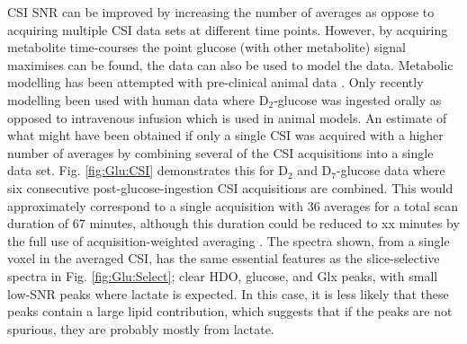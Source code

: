 \ac{CSI} \ac{SNR} can be improved by increasing the number of averages as oppose to acquiring multiple \ac{CSI} data sets at different time points. However, by acquiring metabolite time-courses the point glucose (with other metabolite) signal maximises can be found, the data can also be used to model the data. Metabolic modelling has been attempted with pre-clinical animal data \cite{Lu2017QuantitativeSpectroscopy, Rich20201HVivo, Kreis2020MeasuringMRI, Simoes2022GlucoseGlioblastoma}. Only recently modelling been used with human data where D$_2$-glucose was ingested orally \cite{Ruhm2022Dynamic9.4T} as opposed to intravenous infusion which is used in animal models. An estimate of what might have been obtained if only a single \ac{CSI} was acquired with a higher number of averages by combining several of the \ac{CSI} acquisitions into a single data set. Fig. \ref{fig:Glu:CSI} demonstrates this for D$_2$ and D$_7$-glucose data where six consecutive post-glucose-ingestion \ac{CSI} acquisitions are combined. This would approximately correspond to a single acquisition with 36 averages for a total scan duration of 67 minutes, although this duration could be reduced to xx minutes by the full use of acquisition-weighted averaging \cite{Pohmann2001AccurateCSI}. The spectra shown, from a single voxel in the averaged \ac{CSI}, has the same essential features as the slice-selective spectra in Fig. \ref{fig:Glu:Select}; clear \ac{HDO}, glucose, and Glx peaks, with small low-\ac{SNR} peaks where lactate is expected. In this case, it is less likely that these peaks contain a large lipid contribution, which suggests that if the peaks are not spurious, they are probably mostly from lactate. 


